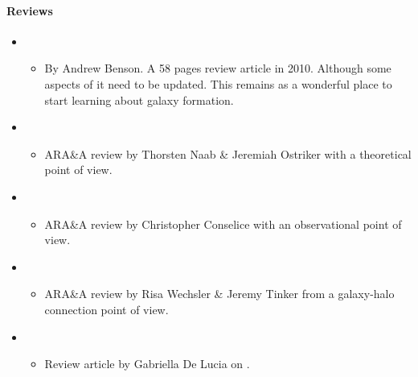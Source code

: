 \documentclass[letterpaper,10pt,english]{sphinxmanual}
\begin{document}
\paragraph{Reviews}
\label{\detokenize{resource/astro/topics/galaxy_formation_model:reviews}}\begin{itemize}
\item {} 
\begin{itemize}
\item {} 
By Andrew Benson. A 58 pages review article in 2010. Although some
aspects of it need to be updated. This remains as a wonderful
place to start learning about galaxy formation.

\end{itemize}

\item {} 
\begin{itemize}
\item {} 
ARA\&A review by Thorsten Naab \& Jeremiah Ostriker with a
theoretical point of view.

\end{itemize}

\item {} 
\begin{itemize}
\item {} 
ARA\&A review by Christopher Conselice with an observational point
of view.

\end{itemize}

\item {} 
\begin{itemize}
\item {} 
ARA\&A review by Risa Wechsler \& Jeremy Tinker from a galaxy-halo
connection point of view.

\end{itemize}

\item {} 
\begin{itemize}
\item {} 
Review article by Gabriella De Lucia on .

\end{itemize}

\end{itemize}
\end{document}
